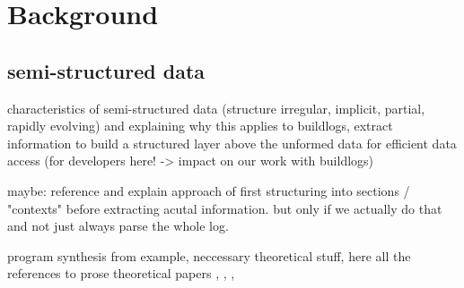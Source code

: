 \documentclass[\myrootdir/main.tex]{subfiles}
\begin{document}
\section{Background}

\subsection{semi-structured data}
characteristics of semi-structured data (structure irregular, implicit, partial, rapidly evolving) and explaining why this applies to buildlogs, extract information to build a structured layer above the unformed data for efficient data access (for developers here! -> impact on our work with buildlogs) \cite{abiteboul1997querying}

maybe: reference \cite{smith1997information} and explain approach of first structuring into sections / "contexts" before extracting acutal information. but only if we actually do that and not just always parse the whole log.

program synthesis from example, neccessary theoretical stuff,
here all the references to prose theoretical papers \cite{le2014flashextract:}, \cite{polozov2015flashmeta:}, \cite{mitchell1982generalization}, 
\end{document}
